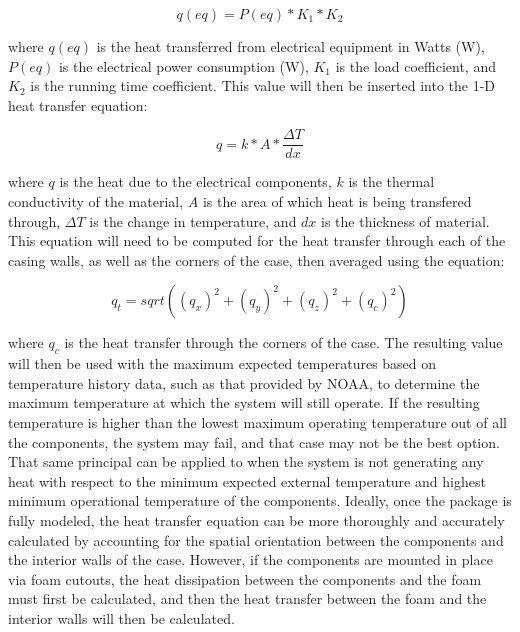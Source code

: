 \begin{equation}
q(eq) = P(eq)*K_1*K_2
\end{equation}

where $q(eq)$ is the heat transferred from electrical equipment in Watts (W), $P(eq)$ is the electrical power consumption (W), $K_1$ is the load
coefficient, and $K_2$ is the running time coefficient.  This value will then be inserted into the 1-D heat transfer equation:

\begin{equation}
q=k*A*\frac{\Delta T}{dx}
\end{equation}

where $q$ is the heat due to the electrical components, $k$ is the thermal conductivity of the material, $A$ is the area of which heat is being transfered
through, $\Delta T$ is the change in temperature, and $dx$ is the thickness of material. This equation will need to be computed for the heat transfer
through each of the casing walls, as well as the corners of the case, then averaged using the equation: 

$$q_t = sqrt((q_x)^2+(q_y)^2+(q_z)^2+(q_c)^2)$$

where $q_c$ is the heat transfer through the corners of the case. The resulting value will then be used with the maximum expected temperatures based on
temperature history data, such as that provided by NOAA, to determine the maximum temperature at which the system will still operate. If the resulting
temperature is higher than the lowest maximum operating temperature out of all the components, the system may fail, and that case may not be the best
option. That same principal can be applied to when the system is not generating any heat with respect to the minimum expected external temperature and
highest minimum operational temperature of the components. Ideally, once the package is fully modeled, the heat transfer equation can be more
thoroughly and accurately calculated by accounting for the spatial orientation between the components and the interior walls of the case. However,
if the components are mounted in place via foam cutouts, the heat dissipation between the components and the foam must first be calculated, and then
the heat transfer between the foam and the interior walls will then be calculated.


